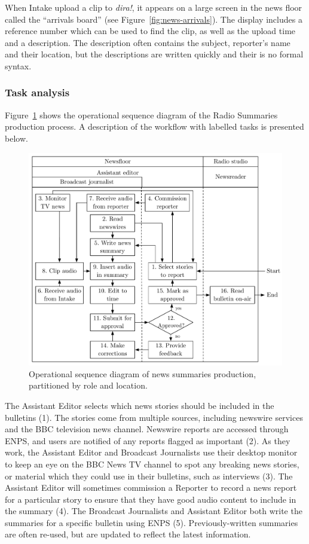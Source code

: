 When Intake upload a clip to \textit{dira!}, it appears on a large screen in the news floor called the ``arrivals
board'' (see Figure~\ref{fig:news-arrivals}). The display includes a reference number which can be used to find the
clip, as well as the upload time and a description. The description often contains the subject, reporter's name and
their location, but the descriptions are written quickly and their is no formal syntax.

\subsubsection{Task analysis}
Figure~\ref{fig:news-flowchart} shows the operational sequence diagram of the Radio Summaries production process. A
description of the workflow with labelled tasks is presented below.

\begin{figure}[h]
	\centering
	\includegraphics[width=.9\columnwidth]{figs/news-workflow.pdf}
  \caption{Operational sequence diagram of news summaries production, partitioned by role and location.}
	\label{fig:news-flowchart}
\end{figure}

The Assistant Editor selects which news stories should be included in the bulletins (1). The stories come from multiple
sources, including newswire services and the BBC television news channel.  Newswire reports are accessed through ENPS,
and users are notified of any reports flagged as important (2).  As they work, the Assistant Editor and Broadcast
Journalists use their desktop monitor to keep an eye on the BBC News TV channel to spot any breaking news stories, or
material which they could use in their bulletins, such as interviews (3).  The Assistant Editor will sometimes
commission a Reporter to record a news report for a particular story to ensure that they have good audio content to
include in the summary (4). The Broadcast Journalists and Assistant Editor both write the summaries for a specific
bulletin using ENPS (5).  Previously-written summaries are often re-used, but are updated to reflect the latest
information.

